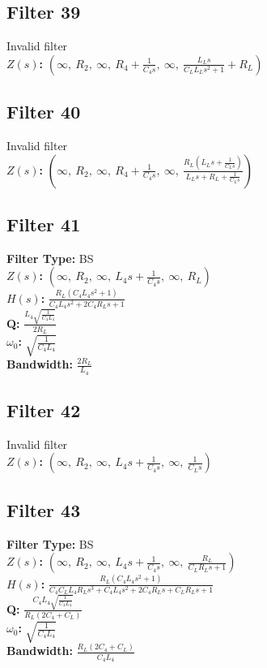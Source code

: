 \documentclass{article}
\begin{document}
\subsection*{Filter 39}
Invalid filter \\ 
\textbf{$Z(s)$:} $\left( \infty, \  R_{2}, \  \infty, \  R_{4} + \frac{1}{C_{4} s}, \  \infty, \  \frac{L_{L} s}{C_{L} L_{L} s^{2} + 1} + R_{L}\right)$ \\ 
\subsection*{Filter 40}
Invalid filter \\ 
\textbf{$Z(s)$:} $\left( \infty, \  R_{2}, \  \infty, \  R_{4} + \frac{1}{C_{4} s}, \  \infty, \  \frac{R_{L} \left(L_{L} s + \frac{1}{C_{L} s}\right)}{L_{L} s + R_{L} + \frac{1}{C_{L} s}}\right)$ \\ 
\subsection*{Filter 41}
\textbf{Filter Type:} BS \\ 
\textbf{$Z(s)$:} $\left( \infty, \  R_{2}, \  \infty, \  L_{4} s + \frac{1}{C_{4} s}, \  \infty, \  R_{L}\right)$ \\ 
\textbf{$H(s)$:} $\frac{R_{L} \left(C_{4} L_{4} s^{2} + 1\right)}{C_{4} L_{4} s^{2} + 2 C_{4} R_{L} s + 1}$ \\ 
\textbf{Q:} $\frac{L_{4} \sqrt{\frac{1}{C_{4} L_{4}}}}{2 R_{L}}$ \\ 
\textbf{$\omega_0$:} $\sqrt{\frac{1}{C_{4} L_{4}}}$ \\ 
\textbf{Bandwidth:} $\frac{2 R_{L}}{L_{4}}$ \\ 
\subsection*{Filter 42}
Invalid filter \\ 
\textbf{$Z(s)$:} $\left( \infty, \  R_{2}, \  \infty, \  L_{4} s + \frac{1}{C_{4} s}, \  \infty, \  \frac{1}{C_{L} s}\right)$ \\ 
\subsection*{Filter 43}
\textbf{Filter Type:} BS \\ 
\textbf{$Z(s)$:} $\left( \infty, \  R_{2}, \  \infty, \  L_{4} s + \frac{1}{C_{4} s}, \  \infty, \  \frac{R_{L}}{C_{L} R_{L} s + 1}\right)$ \\ 
\textbf{$H(s)$:} $\frac{R_{L} \left(C_{4} L_{4} s^{2} + 1\right)}{C_{4} C_{L} L_{4} R_{L} s^{3} + C_{4} L_{4} s^{2} + 2 C_{4} R_{L} s + C_{L} R_{L} s + 1}$ \\ 
\textbf{Q:} $\frac{C_{4} L_{4} \sqrt{\frac{1}{C_{4} L_{4}}}}{R_{L} \left(2 C_{4} + C_{L}\right)}$ \\ 
\textbf{$\omega_0$:} $\sqrt{\frac{1}{C_{4} L_{4}}}$ \\ 
\textbf{Bandwidth:} $\frac{R_{L} \left(2 C_{4} + C_{L}\right)}{C_{4} L_{4}}$ \\ 
\end{document}
